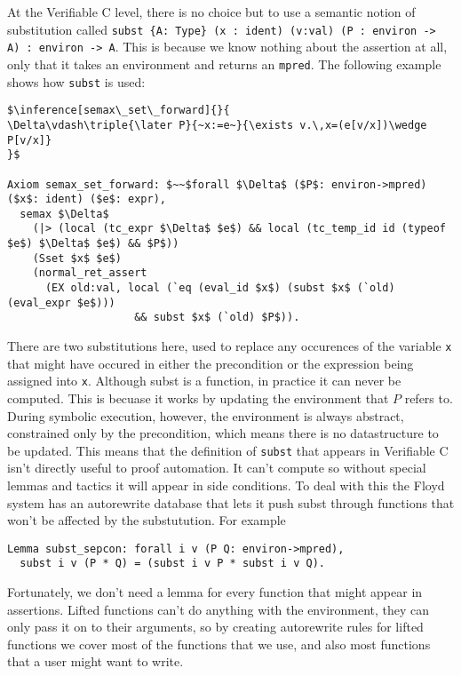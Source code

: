 \documentclass{puthesis}
\begin{document}
At the Verifiable C level, there is no choice but to use a semantic
notion of substitution called 
\lstinline|subst {A: Type} (x : ident) (v:val) (P : environ -> A) : environ -> A|.
This is because we know nothing about the assertion at all, only that
it takes an environment and returns an \lstinline|mpred|. The following example
shows how \lstinline|subst| is used:

\begin{lstlisting}
$\inference[semax\_set\_forward]{}{
\Delta\vdash\triple{\later P}{~x:=e~}{\exists v.\,x=(e[v/x])\wedge P[v/x]}
}$

Axiom semax_set_forward: $~~$forall $\Delta$ ($P$: environ->mpred) ($x$: ident) ($e$: expr),
  semax $\Delta$
    (|> (local (tc_expr $\Delta$ $e$) && local (tc_temp_id id (typeof $e$) $\Delta$ $e$) && $P$))
    (Sset $x$ $e$) 
    (normal_ret_assert 
      (EX old:val, local (`eq (eval_id $x$) (subst $x$ (`old) (eval_expr $e$)))
                    && subst $x$ (`old) $P$)).
\end{lstlisting}

There are two substitutions here, used to replace any occurences of the
variable \lstinline|x| that might have occured in either the precondition
or the expression being assigned into \lstinline|x|. 
Although subst is a function, in practice it can never be computed.
This is becuase it works by updating the environment that $P$
refers to. During symbolic execution, however, the environment is always
abstract, constrained only by the precondition, which means there is
no datastructure to be updated. This means that the definition of 
\lstinline|subst| that appears in Verifiable C isn't directly 
useful to proof automation. It can't compute so without special
lemmas and tactics it will appear in side conditions. To deal with
this the Floyd system has an autorewrite database that lets it push
subst through functions that won't be affected by the substutution. For
example 

\begin{lstlisting}
Lemma subst_sepcon: forall i v (P Q: environ->mpred),
  subst i v (P * Q) = (subst i v P * subst i v Q).
\end{lstlisting}

Fortunately, we don't need a lemma for every function that might
appear in assertions. Lifted functions can't do anything with the
environment, they can only pass it on to their arguments, so
by creating autorewrite rules for lifted functions we cover
most of the functions that we use, and also most functions
that a user might want to write. 
\end{document}
